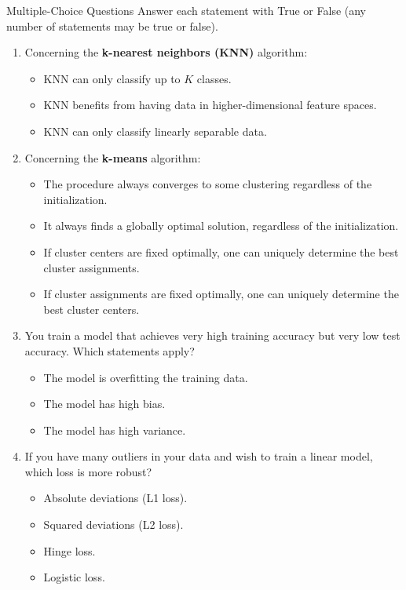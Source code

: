 \documentclass{article}
\begin{document}

\begin{exercise}{Multiple-Choice Questions}
  Answer each statement with True or False (any number of statements may be true or false).
  
  \begin{enumerate}
    \item Concerning the \textbf{k-nearest neighbors (KNN)} algorithm:
      \begin{itemize}
        \item KNN can only classify up to $K$ classes.
        \item KNN benefits from having data in higher-dimensional feature spaces.
        \item KNN can only classify linearly separable data.
      \end{itemize}

    \item Concerning the \textbf{k-means} algorithm:
      \begin{itemize}
        \item The procedure always converges to some clustering regardless of the initialization.
        \item It always finds a globally optimal solution, regardless of the initialization.
        \item If cluster centers are fixed optimally, one can uniquely determine the best cluster assignments.
        \item If cluster assignments are fixed optimally, one can uniquely determine the best cluster centers.
      \end{itemize}

    \item You train a model that achieves very high training accuracy but very low test accuracy. Which statements apply?
      \begin{itemize}
        \item The model is overfitting the training data.
        \item The model has high bias.
        \item The model has high variance.
      \end{itemize}

    \item If you have many outliers in your data and wish to train a linear model, which loss is more robust?
      \begin{itemize}
        \item Absolute deviations (L1 loss).
        \item Squared deviations (L2 loss).
        \item Hinge loss.
        \item Logistic loss.
      \end{itemize}


\end{enumerate}
\end{exercise}
\end{document}
